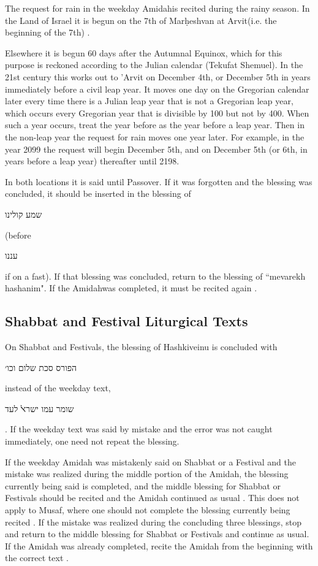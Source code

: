 \documentclass[11pt]{article}
\newcommand{\hebword}[1]{‎\begin{hebrew}\beginR #1 \endR\end{hebrew}}
\newcommand{\heth}{\d{h}}
\newcommand{\amidah}{Amidah\space}
\newcommand{\arvit}{Arvit}
\begin{document}
The request for rain in the weekday \amidah is recited during the rainy season.  In the Land of Israel it is begun on the 7th of Mar\heth eshvan at \arvit\space (i.e. the beginning of the 7th) \parencite*[18:5 citing OC 117]{PH}.

Elsewhere it is begun 60 days after the Autumnal Equinox, which for this purpose is reckoned according to the Julian calendar (Tekufat Shemuel).  In the 21st century this works out to 'Arvit on December 4th, or December 5th in years immediately before a civil leap year.  It moves one day on the Gregorian calendar later every time there is a Julian leap year that is not a Gregorian leap year, which occurs every Gregorian year that is divisible by 100 but not by 400. When such a year occurs, treat the year before as the year before a leap year.  Then in the non-leap year the request for rain moves one year later.  For example, in the year 2099 the request will begin December 5th, and on December 5th (or 6th, in years before a leap year) thereafter until 2198.

In both locations it is said until Passover. If it was forgotten and the blessing was concluded, it should be inserted in the blessing of \hebword{שמע קולינו} (before \hebword{עננו} if on a fast). If that blessing was concluded, return to the blessing of ``mevarekh hashanim".  If the \amidah was completed, it must be recited again \parencite*{PH}.

\subsection{Shabbat and Festival Liturgical Texts}

On Shabbat and Festivals, the blessing of Hashkiveinu is concluded with \hebword{הפורס סכת שלום וכו׳} instead of the weekday text, \hebword{שומר עמו ישרﭏ לעד}.  If the weekday text was said by mistake and the error was not caught immediately, one need not repeat the blessing.

If the weekday Amidah was mistakenly said on Shabbat or a Festival and the mistake was realized during the middle portion of the Amidah, the blessing currently being said is completed, and the middle blessing for Shabbat or Festivals should be recited and the Amidah continued as usual \parencite*[76:16]{Kitzur}.  This does not apply to Musaf, where one should not complete the blessing currently being recited \parencite*[76:19]{Kitzur}.  If the mistake was realized during the concluding three blessings, stop and return to the middle blessing for Shabbat or Festivals and continue as usual. If the Amidah was already completed, recite the Amidah from the beginning with the correct text \parencite*[76:18]{Kitzur}.
\end{document}
